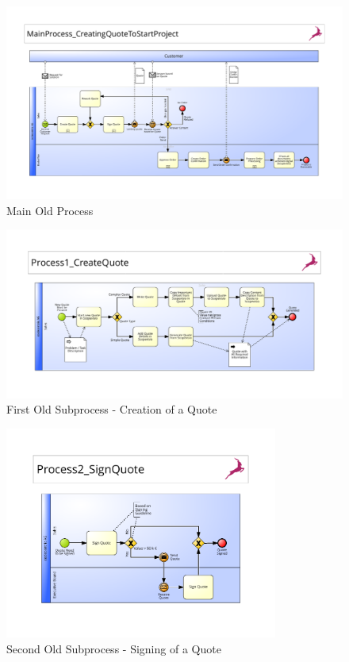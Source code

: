 \begin{figure}[h]
	\begin{center}
		\includegraphics[width=0.9\textheight,angle=90]{./appendix/pbmnOld/0_main.pdf}
		\caption{Main Old Process}\label{fig:0_main}
	\end{center}
\end{figure} 

\begin{figure}[h]
	\begin{center}
		\includegraphics[width=0.9\textheight,angle=90]{./appendix/pbmnOld/0-1_createQuote.pdf}
		\caption{First Old Subprocess - Creation of a Quote}\label{fig:0-1_sub}
	\end{center}
\end{figure} 

\begin{figure}[h]
	\begin{center}
		\includegraphics[width=0.8\textwidth]{./appendix/pbmnOld/0-2_signQuote.pdf}
		\caption{Second Old Subprocess - Signing of a Quote}\label{fig:0-2_sub}
	\end{center}
\end{figure}

